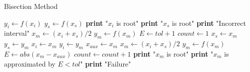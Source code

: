 \documentclass{article}
\begin{document}
  \begin{algorithm}
    \caption{Bisection Method}
    \begin{algorithmic}[1]
        \State $y_{i} \gets f(x_{i})$
        \State $y_{s} \gets f(x_{s})$
          \State \textbf{print} "$x_{i}$ is root"
          \State \textbf{print} "$x_{s}$ is root"
          \State \textbf{print} "Incorrect interval"
        \Else
          \State $x_{m} \gets (x_{i} + x_{s}) / 2$
          \State $y_{m} \gets f(x_{m})$
          \State $E \gets tol + 1$
          \State $count \gets 1$
              \State $x_{s} \gets x_{m}$
              \State $y_{s} \gets y_{m}$
            \Else
              \State $x_{i} \gets x_{m}$
              \State $y_{i} \gets y_{m}$
            \EndIf
            \State $x_{aux} \gets x_{m}$
            \State $x_{m} \gets (x_{i} + x_{s}) / 2$
            \State $y_{m} \gets f(x_{m})$
            \State $E \gets abs(x_{m} - x_{aux})$
            \State $count \gets count + 1$
          \EndWhile
            \State \textbf{print} "$x_{m}$ is root"
            \State \textbf{print} "$x_{m}$ is approximated by $E < tol$"
          \Else
            \State \textbf{print} "Failure"
          \EndIf
        \EndIf
      \EndProcedure
    \end{algorithmic}
  \end{algorithm}
\end{document}

